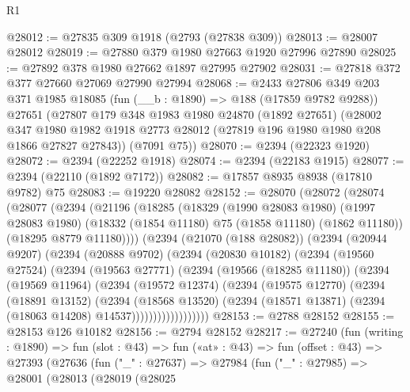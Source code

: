 \begin{lexlean}{R1}
\begin{coremodule}
@28012 := @27835 @309 @1918 (@2793 (@27838 @309))
@28013 := @28007 @28012
@28019 := @27880 @379 @1980 @27663 @1920 @27996 @27890
@28025 := @27892 @378 @1980 @27662 @1897 @27995 @27902
@28031 := @27818 @372 @377 @27660 @27069 @27990 @27994
@28068 := @2433
    @27806
    @349
    @203
    @371
    @1985
    @18085
    (fun (__b : @1890) => @188 (@17859 @9782 @9288))
    @27651
    (@27807
      @179
      @348
      @1983
      @1980
      @24870
      (@1892 @27651)
      (@28002
        @347
        @1980
        @1982
        @1918
        @2773
        @28012
        (@27819 @196 @1980 @1980 @208 @1866 @27827 @27843))
      (@7091 @75))
@28070 := @2394 (@22323 @1920)
@28072 := @2394 (@22252 @1918)
@28074 := @2394 (@22183 @1915)
@28077 := @2394 (@22110 (@1892 @7172))
@28082 := @17857 @8935 @8938 (@17810 @9782) @75
@28083 := @19220 @28082
@28152 := @28070
    (@28072
      (@28074
        (@28077
          (@2394
            (@21196
              (@18285
                (@18329
                  (@1990 @28083 @1980)
                  (@1997 @28083 @1980)
                  (@18332 (@1854 @11180) @75 (@1858 @11180) (@1862 @11180))
                  (@18295 @8779 @11180))))
            (@2394
              (@21070 (@188 @28082))
              (@2394
                (@20944 @9207)
                (@2394
                  (@20888 @9702)
                  (@2394
                    (@20830 @10182)
                    (@2394
                      (@19560 @27524)
                      (@2394
                        (@19563 @27771)
                        (@2394
                          (@19566 (@18285 @11180))
                          (@2394
                            (@19569 @11964)
                            (@2394
                              (@19572 @12374)
                              (@2394
                                (@19575 @12770)
                                (@2394
                                  (@18891 @13152)
                                  (@2394
                                    (@18568 @13520)
                                    (@2394
                                      (@18571 @13871)
                                      (@2394 (@18063 @14208) @14537))))))))))))))))))
@28153 := @2788 @28152
@28155 := @28153 @126 @10182
@28156 := @2794 @28152
@28217 := @27240
    (fun (writing : @1890) =>
    fun (slot : @43) =>
    fun («at» : @43) =>
    fun (offset : @43) =>
    @27393
      (@27636
        (fun ("_" : @27637) =>
        @27984
          (fun ("_" : @27985) =>
          @28001
            (@28013
              (@28019
                (@28025

\end{coremodule}
\end{lexlean}
